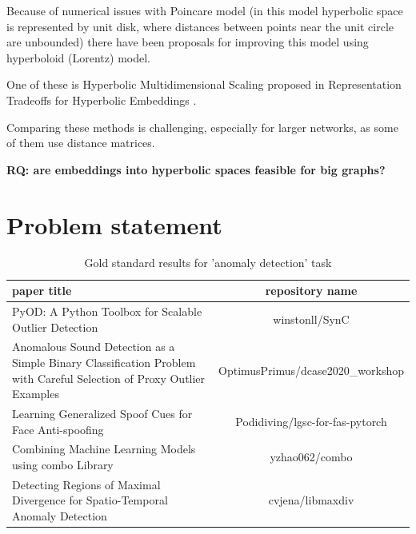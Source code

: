 \documentclass[11pt]{report}
\begin{document}
{\begin{enumerate}
\begin{enumerate}
Because of numerical issues with Poincare model (in this model hyperbolic space is represented by unit disk, where distances between points near the unit circle are unbounded) there have been proposals for improving this model using hyperboloid (Lorentz) model.

One of these is Hyperbolic Multidimensional Scaling proposed in Representation Tradeoffs for Hyperbolic Embeddings \cite{tradeoffs}.

Comparing these methods is challenging, especially for larger networks, as some of them use distance matrices.

\textbf{\textbf{RQ: are embeddings into hyperbolic spaces feasible for big graphs?}}
\end{enumerate}
\end{enumerate}
}

\chapter{Problem statement}

\begin{table}[hbt!]
\caption{Gold standard results for 'anomaly detection' task}
\begin{tabular}{|p{6cm}|c|}
\hline                                                                                                                paper title &                                repository name\\ \hline
\midrule
                                                                PyOD: A Python Toolbox for Scalable Outlier Detection &                      winstonll/SynC \\ \hline
 Anomalous Sound Detection as a Simple Binary Classification Problem with Careful Selection of Proxy Outlier Examples &    OptimusPrimus/dcase2020\_workshop \\ \hline
                                                               Learning Generalized Spoof Cues for Face Anti-spoofing &     Podidiving/lgsc-for-fas-pytorch \\ \hline
                                                                Combining Machine Learning Models using combo Library &                      yzhao062/combo \\ \hline
                                        Detecting Regions of Maximal Divergence for Spatio-Temporal Anomaly Detection &                    cvjena/libmaxdiv \\ \hline
\end{tabular}
\end{table}
\end{document}
